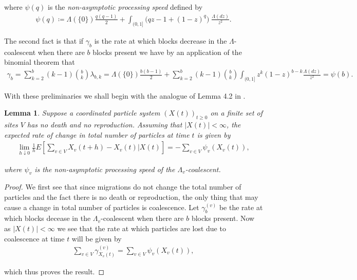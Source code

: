 \documentclass[11pt]{article}
\newtheorem{lemma}{Lemma}
\theoremstyle{definition}
\begin{document}
\noindent where $\psi(q)$ is the \emph{non-asymptotic processing speed} defined by
%
\begin{align*}
    \psi(q) \coloneqq \Lambda(\{0\})\frac{q(q-1)}{2}+\int_{(0,1]} \Big(qz - 1 + (1-z)^q\Big)\;\frac{\Lambda(dz)}{z^2}.
\end{align*}

\noindent The second fact is that if $\gamma_b$ is the rate at which blocks decrease in the $\Lambda$-coalescent when there are $b$ blocks present we have by an application of the binomial theorem that
%
\begin{align*}
    \gamma_b = \sum_{k = 2}^b (k-1)\binom{b}{k} \lambda_{b,k} = \Lambda(\{0\})\frac{b(b-1)}{2} + \sum_{k = 2}^b (k-1)\binom{b}{k} \int_{(0,1]} z^k(1-z)^{b-k}\frac{\Lambda(dz)}{z^2} = \psi(b).
\end{align*}

\noindent With these preliminaries we shall begin with the analogue of Lemma 4.2 in \cite{Johnston2023}.

\begin{lemma}\label{L:expchange}
    Suppose a coordinated particle system $(X(t))_{t \geq 0}$ on a finite set of sites $V$ has no death and no reproduction. Assuming that $|X(t)| < \infty$, the expected rate of change in total number of particles at time $t$ is given by
    \begin{align*}
         \lim_{h \downarrow 0} \frac{1}{h}E\left[\sum_{v\in V} X_v(t+h) - X_v(t) \Big| X(t)\right]=-\sum_{v \in V} \psi_v(X_v(t)),
    \end{align*}

    \noindent where $\psi_v$ is the non-asymptotic processing speed of the $\Lambda_v$-coalescent.
\end{lemma}

\begin{proof}
    We first see that since migrations do not change the total number of particles and the fact there is no death or reproduction, the only thing that may cause a change in total number of particles is coalescence. Let $\gamma^{(v)}_b$ be the rate at which blocks decease in the $\Lambda_v$-coalescent when there are $b$ blocks present. Now as $|X(t)| < \infty$ we see that the rate at which particles are lost due to coalescence at time $t$ will be given by
    \begin{align*}
        \sum_{v \in V} \gamma^{(v)}_{X_v(t)} = \sum_{v \in V} \psi_v(X_v(t)),
    \end{align*}

    \noindent which thus proves the result.
\end{proof}
\end{document}
